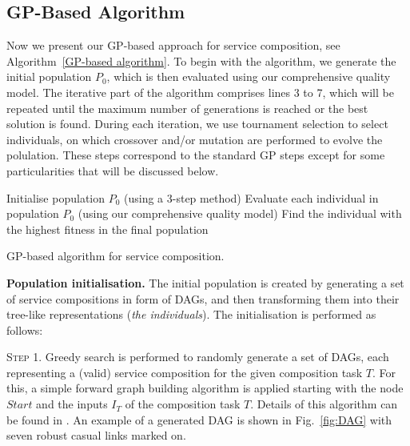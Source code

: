 \subsection{GP-Based Algorithm}\label{GP-Based Algorithm}

Now we present our GP-based approach for service composition, see Algorithm~\ref{GP-based algorithm}. To begin with the algorithm, we generate the initial population $P_0$, which is then evaluated using our comprehensive quality model. The iterative part of the algorithm comprises lines 3 to 7,  which will be repeated until the maximum number of generations is reached or the best solution is found. During each iteration, we use tournament selection to select individuals, on which crossover and/or mutation are performed to evolve the polulation. These steps correspond to the standard GP steps \cite{koza1992genetic} except for some particularities that will be discussed below.


\begin{algorithm}[h!tb]
 \SetNlSty{}{}{:}
 Initialise population $P_0$ (using a 3-step method)\;
 Evaluate each individual in population $P_0$ (using our comprehensive quality model)\;
 Find the individual with the highest fitness in the final population\;
\caption{GP-based algorithm for service composition.}
\label{GP-based algorithm}
\end{algorithm} 

\textbf{Population initialisation.}
The initial population is created by generating a set of service compositions in form of DAGs, and then transforming them into their tree-like representations (\emph{the individuals}). The initialisation is performed as follows: 

\textsc{Step 1}. Greedy search is performed to randomly generate a set of DAGs, each representing a (valid) service composition for the given composition task $T$. For this, a simple forward graph building algorithm is applied starting with the node $Start$ and the inputs $I_T$ of the composition task $T$. Details of this algorithm can be found in \cite{ma2015hybrid}. An example of a generated DAG is shown in Fig.~\ref{fig:DAG} with seven robust casual links marked on.

